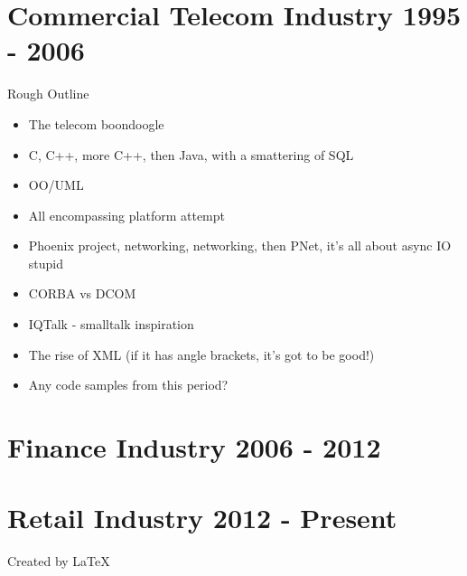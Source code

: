 \documentclass[12pt]{article}
\begin{document}
\section{Commercial Telecom Industry 1995 - 2006}
	Rough Outline
	\begin{itemize}
	\item The telecom boondoogle
	\item C, C++, more C++, then Java, with a smattering of SQL
	\item OO/UML
	\item All encompassing platform attempt
	\item Phoenix project, networking, networking, then PNet, it's all about async IO stupid
	\item CORBA vs DCOM
	\item IQTalk - smalltalk inspiration
	\item The rise of XML (if it has angle brackets, it's got to be good!)
	\item Any code samples from this period?
	\end{itemize}

\section{Finance Industry 2006 - 2012}

\section{Retail Industry 2012 - Present}

Created by \LaTeX\	
\end{document}
